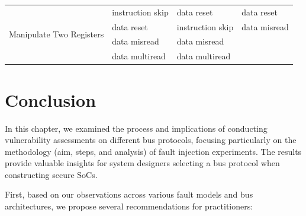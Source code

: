 \begin{table}[]
\begin{tabular}{llll}
\midrule
\multirow{4}{*}{Manipulate Two Registers} & instruction skip & data reset       & data reset   \\
                                          & data reset       & instruction skip & data misread \\
                                          & data misread     & data misread     &              \\
                                          & data multiread   & data multiread   &             \\
\bottomrule                         
\end{tabular}
\end{table}

\section{Conclusion}
In this chapter, we examined the process and implications of conducting vulnerability assessments on different bus protocols, focusing particularly on the methodology (aim, steps, and analysis) of fault injection experiments. The results provide valuable insights for system designers selecting a bus protocol when constructing secure SoCs.

First, based on our observations across various fault models and bus architectures, we propose several recommendations for practitioners:

